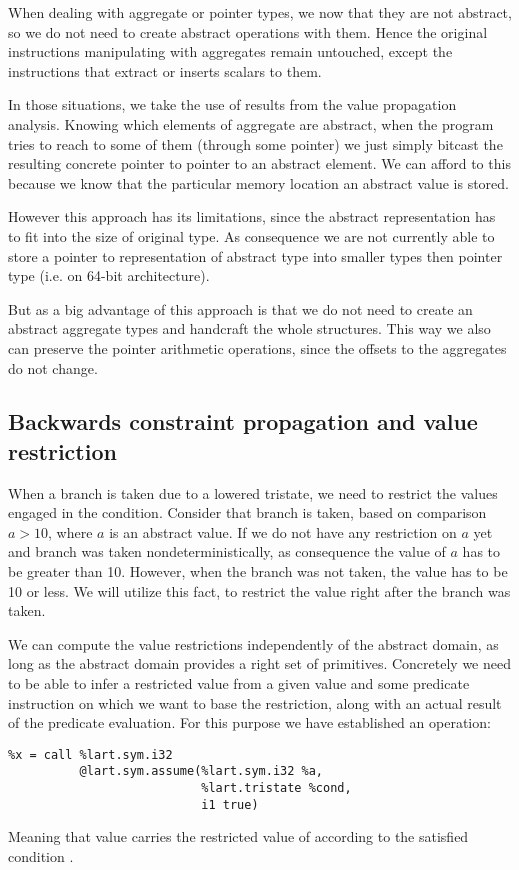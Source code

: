 When dealing with aggregate or pointer types, we now that they are not
abstract, so we do not need to create abstract operations with them. Hence the
original instructions manipulating with aggregates remain untouched, except the
instructions that extract or inserts scalars to them.

In those situations, we take the use of results from the value propagation analysis.
Knowing which elements of aggregate are abstract, when the program tries to
reach to some of them (through some pointer) we just simply bitcast
the resulting concrete pointer to pointer to an abstract element. We can afford
to this because we know that the particular memory location an abstract value is
stored.

However this approach has its limitations, since the abstract representation has
to fit into the size of original type. As consequence we are not currently able
to store a pointer to representation of abstract type into smaller types then
pointer type (i.e.  on 64-bit architecture).

But as a big advantage of this approach is that we do not need to create an
abstract aggregate types and handcraft the whole structures. This way we also
can preserve the pointer arithmetic operations, since the offsets to the
aggregates do not change.

\subsection{Backwards constraint propagation and value restriction}
\label{sec:bcp}
When a branch is taken due to a lowered tristate, we need to restrict the values
engaged in the condition. Consider that branch is taken, based on comparison $a
> 10$, where $a$ is an abstract value. If we do not have any restriction on $a$
yet and branch was taken nondeterministically, as consequence the value of $a$
has to be greater than 10. However, when the branch was not taken,
the value has to be 10 or less. We will utilize this fact, to restrict the value
right after the branch was taken.

We can compute the value restrictions independently of the abstract domain, as
long as the abstract domain provides a right set of primitives. Concretely we
need to be able to infer a restricted value from a given value and some predicate
instruction on which we want to base the restriction, along with an actual
result of the predicate evaluation. For this purpose we have established
an  operation:
\begin{verbatim}
%x = call %lart.sym.i32
          @lart.sym.assume(%lart.sym.i32 %a,
                           %lart.tristate %cond,
                           i1 true)
\end{verbatim}
Meaning that value  carries the restricted value of 
according to the satisfied condition .

